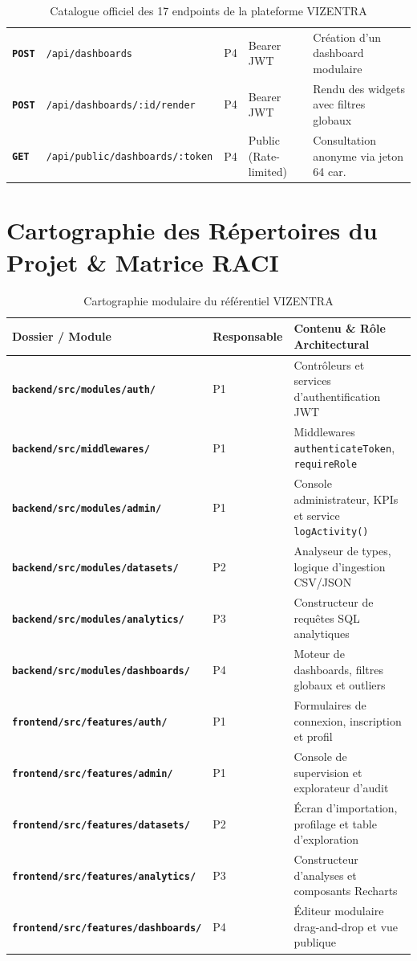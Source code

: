 \documentclass[11pt,a4paper]{article}
\begin{document}
\begin{table}[h!]
\begin{tabularx}{\textwidth}{>{\bfseries}p{1.4cm} p{4.2cm} p{1.2cm} p{2.8cm} X}
    \texttt{POST} & \texttt{/api/dashboards} & P4 & Bearer JWT & Création d'un dashboard modulaire \\
    \rowcolor{tablerowalt}
    \texttt{POST} & \texttt{/api/dashboards/:id/render} & P4 & Bearer JWT & Rendu des widgets avec filtres globaux \\
    \texttt{GET} & \texttt{/api/public/dashboards/:token} & P4 & Public (Rate-limited) & Consultation anonyme via jeton 64 car. \\
    \bottomrule
\end{tabularx}
\caption{Catalogue officiel des 17 endpoints de la plateforme VIZENTRA}
\end{table}

\section{Cartographie des Répertoires du Projet \& Matrice RACI}

\begin{table}[h!]
\centering
\small
\renewcommand{\arraystretch}{1.2}
\begin{tabularx}{\textwidth}{>{\bfseries}p{4.8cm} p{2.2cm} X}
    \toprule
    \rowcolor{tableheader}
    \color{white}Dossier / Module & \color{white}Responsable & \color{white}Contenu \& Rôle Architectural \\
    \midrule
    \texttt{backend/src/modules/auth/} & P1 & Contrôleurs et services d'authentification JWT \\
    \rowcolor{tablerowalt}
    \texttt{backend/src/middlewares/} & P1 & Middlewares \texttt{authenticateToken}, \texttt{requireRole} \\
    \texttt{backend/src/modules/admin/} & P1 & Console administrateur, KPIs et service \texttt{logActivity()} \\
    \rowcolor{tablerowalt}
    \texttt{backend/src/modules/datasets/} & P2 & Analyseur de types, logique d'ingestion CSV/JSON \\
    \texttt{backend/src/modules/analytics/} & P3 & Constructeur de requêtes SQL analytiques \\
    \rowcolor{tablerowalt}
    \texttt{backend/src/modules/dashboards/} & P4 & Moteur de dashboards, filtres globaux et outliers \\
    \texttt{frontend/src/features/auth/} & P1 & Formulaires de connexion, inscription et profil \\
    \rowcolor{tablerowalt}
    \texttt{frontend/src/features/admin/} & P1 & Console de supervision et explorateur d'audit \\
    \texttt{frontend/src/features/datasets/} & P2 & Écran d'importation, profilage et table d'exploration \\
    \rowcolor{tablerowalt}
    \texttt{frontend/src/features/analytics/} & P3 & Constructeur d'analyses et composants Recharts \\
    \texttt{frontend/src/features/dashboards/} & P4 & Éditeur modulaire drag-and-drop et vue publique \\
    \bottomrule
\end{tabularx}
\caption{Cartographie modulaire du référentiel VIZENTRA}
\end{table}
\end{document}

